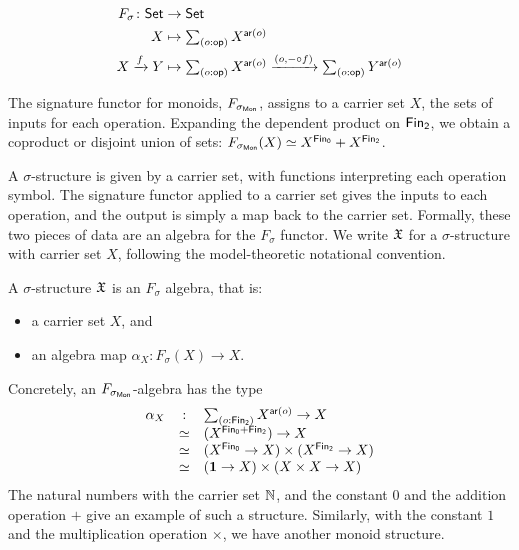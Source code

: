 \begin{definition}
    \begin{align*}
        F_{\sigma} \colon \Set & \to \Set                                     \\
        X                      & \mapsto \dsum{o:\term{op}}{X^{\term{ar}(o)}} \\
        X \xto{f} Y            & \mapsto
        \dsum{o:\term{op}}{X^{\term{ar}(o)}}
        \xto{(o, \blank \comp f)}
        \dsum{o:\term{op}}{Y^{\term{ar}(o)}}
    \end{align*}
\end{definition}

\begin{example}
    The signature functor for monoids, $F_{\sigma_{\mathsf{Mon}}}$, assigns to a carrier set $X$,
    the sets of inputs for each operation.
    Expanding the dependent product on $\Fin[2]$, we obtain a coproduct or disjoint union of sets:
    $F_{\sigma_{\Mon}}(X) \eqv X^{\Fin[0]} + X^{\Fin[2]}$.
\end{example}

A $\sigma$-structure is given by a carrier set, with functions interpreting each operation symbol.
%
The signature functor applied to a carrier set gives the inputs to each operation, and the output is simply a map back
to the carrier set.
%
Formally, these two pieces of data are an algebra for the $F_{\sigma}$ functor.
%
We write $\mathfrak{X}$ for a $\sigma$-structure with carrier set $X$, following the model-theoretic notational convention.

\begin{definition}[Structure]
    A $\sigma$-structure $\mathfrak{X}$ is an $F_{\sigma}$ algebra, that is:
    \begin{itemize}
        \item a carrier set $X$, and
        \item an algebra map $\alpha_{X}\colon F_{\sigma}(X) \to X$.
    \end{itemize}
\end{definition}

\begin{example}
    Concretely, an $F_{\sigma_{\mathsf{Mon}}}$-algebra has the type
    \[
        \begin{array}{rcl}
            \alpha_{X} & :    & \dsum{o:\Fin[2]}{X^{\term{ar}(o)}} \to X       \\
                       & \eqv & (X^{\Fin[0] + \Fin[2]}) \to X                  \\
                       & \eqv & (X^{\Fin[0]} \to X) \times (X^{\Fin[2]} \to X) \\
                       & \eqv & (\unitt \to X) \times (X \times X \to X)
        \end{array}
    \]
    The natural numbers with the carrier set $\mathbb{N}$,
    and the constant $0$ and the addition operation $+$ give an example of such a structure.
    Similarly, with the constant $1$ and the multiplication operation $\times$, we have another monoid structure.
\end{example}

